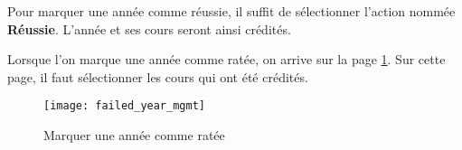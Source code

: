 Pour marquer une année comme réussie, il suffit de sélectionner l'action nommée \textbf{Réussie}. L'année et ses cours seront ainsi crédités. 

Lorsque l'on marque une année comme ratée, on arrive sur la page \ref{fig:fail_year}. Sur cette page, il faut sélectionner les cours qui ont été crédités.

\begin{figure}
\centering
\caption{Marquer une année comme ratée}
\label{fig:fail_year}
\texttt{[image: failed\_year\_mgmt]}

\end{figure}



